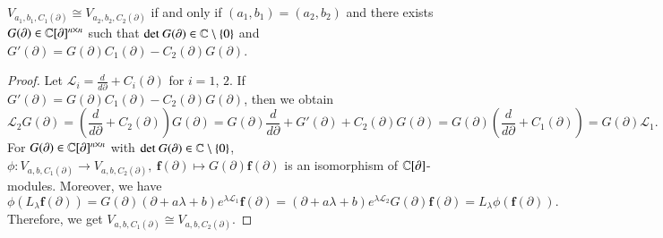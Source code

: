 \documentclass[12pt]{amsart}
\begin{document}
\begin{pro}\label{iso-1}
$V_{a_1,b_1,C_1(\partial)}\cong V_{a_2,b_2,C_2(\partial)}$ if and only if $(a_1,b_1)=(a_2,b_2)$ and there exists $G(\partial)\in\mathbb{C}[\partial]^{n\times n}$ such that $\text{det}~G(\partial)\in\mathbb{C}\setminus \{0\}$ and $G'(\partial)=G(\partial)C_1(\partial)-C_2(\partial)G(\partial)$.
\end{pro}
\begin{proof} Let $\mathcal{L}_i=\frac{d}{d\partial}+C_i(\partial)$ for $i=1$, $2$.
If $G'(\partial)=G(\partial)C_1(\partial)-C_2(\partial)G(\partial)$, then we obtain
$$\mathcal{L}_2G(\partial)=(\frac{d}{d\partial}+C_2(\partial))G(\partial)=G(\partial)\frac{d}{d\partial}+G'(\partial)+C_2(\partial)G(\partial)
=G(\partial)(\frac{d}{d\partial}+C_1(\partial))=G(\partial)\mathcal{L}_1.$$
For $G(\partial)\in\mathbb{C}[\partial]^{n\times n}$ with
$\text{det}~G(\partial)\in\mathbb{C}\setminus\{0\}$,
$\phi: V_{a,b,C_1(\partial)}\rightarrow V_{a,b,C_2(\partial)},\ \mathbf{f}(\partial)\mapsto G(\partial)\mathbf{f}(\partial)$ is an isomorphism of $\mathbb{C}[\partial]$-modules. Moreover, we have
$$\phi (L_\lambda\mathbf{f}(\partial))=
G(\partial)(\partial+a\lambda+b)e^{\lambda\mathcal{L}_1}\mathbf{f}(\partial)=
(\partial+a\lambda+b)e^{\lambda\mathcal{L}_2}G(\partial)\mathbf{f}(\partial)=
L_\lambda\phi(\mathbf{f}(\partial)).
$$ Therefore, we get $V_{a,b,C_1(\partial)}\cong V_{a,b,C_2(\partial)}$.


\end{proof}
\end{document}

